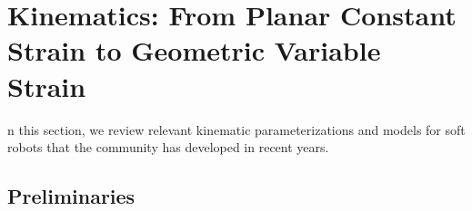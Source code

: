 \section{Kinematics: From Planar Constant Strain to Geometric Variable Strain}\label{sec:background:kinematics}
n this section, we review relevant kinematic parameterizations and models for soft robots that the community has developed in recent years.

\subsection{Preliminaries}
